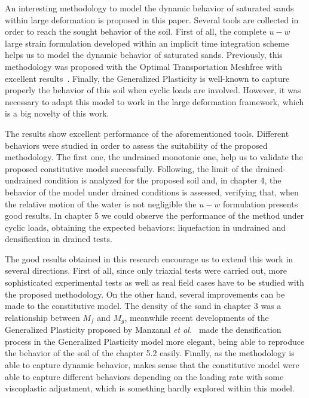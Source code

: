 \documentclass[preprint,12pt,a4paper]{elsarticle}
\begin{document}
An interesting methodology to model the dynamic behavior of saturated sands within large deformation is proposed in this paper. Several tools are collected in order to reach the sought behavior of the soil. First of all, the complete $u-w$ large strain formulation developed within an implicit time integration scheme helps us to model the dynamic behavior of saturated sands. Previously, this methodology was proposed with the Optimal Transportation Meshfree with excellent results~\cite{Navas:17c}. Finally, the Generalized Plasticity is well-known to capture properly the behavior of this soil when cyclic loads are involved. However, it was necessary to adapt this model to work in the large deformation framework, which is a big novelty of this work.


The results show excellent performance of the aforementioned tools. Different behaviors were studied in order to assess the suitability of the proposed methodology. The first one, the undrained monotonic one, help us to validate the proposed constitutive model successfully. Following, the limit of the drained-undrained condition is analyzed for the proposed soil and, in chapter 4, the behavior of the model under drained conditions is assessed, verifying that, when the relative motion of the water is not negligible the $u-w$ formulation presents good results. In chapter 5 we could observe the performance of the method under cyclic loads, obtaining the expected behaviors: liquefaction in undrained and densification in drained tests.

The good results obtained in this research encourage us to extend this work in several directions. First of all, since only triaxial tests were carried out, more sophisticated experimental tests as well as real field cases have to be studied with the proposed methodology. On the other hand, several improvements can be made to the constitutive model. The density of the sand in chapter 3 was a relationship between $M_f$ and $M_g$, meanwhile recent developments of the Generalized Plasticity proposed by Manzanal \textit{et al.}~\cite{Manzanal2011,Manzanal2011a} made the densification process in the Generalized Plasticity model more elegant, being able to reproduce the behavior of the soil of the chapter 5.2 easily. Finally, as the methodology is able to capture dynamic behavior, makes sense that the constitutive model were able to capture different behaviors depending on the loading rate with some viscoplastic adjustment, which is something hardly explored within this model. 
\end{document}
